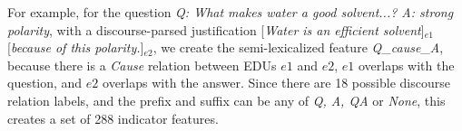 For example, for the question \emph{Q: What makes water a good solvent...?  A: strong polarity}, with a discourse-parsed justification [{\em Water is an efficient solvent}]$_{e1}$ [{\em because of this polarity.}]$_{e2}$, we create the semi-lexicalized feature \emph{Q}\_\emph{cause}\_\emph{A}, because there is a {\em Cause} relation between EDUs $e1$ and $e2$, $e1$ overlaps with the question, and $e2$ overlaps with the answer.
Since there are 18 possible discourse relation labels, and the prefix and suffix can be any of \emph{Q, A, QA} or \emph{None}, this creates a set of 288 indicator features.

%


